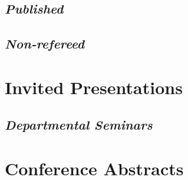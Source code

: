 \documentclass[10pt,a4paper,sans]{moderncv}        %
\begin{document}
\subsection{\textit{Published}} %
\nocite{*}




\renewcommand*{\bibliographyhead}[1]{\subsection{Non-refereed}}
\subsection{\textit{Non-refereed}}

\section{Invited Presentations}
\renewcommand*{\bibliographyhead}[1]{}

\renewcommand*{\bibliographyhead}[1]{\subsection{Departmental Seminars}}
\subsection{\textit{Departmental Seminars}}

\section{Conference Abstracts}
\renewcommand*{\bibliographyhead}[1]{}
\end{document}
